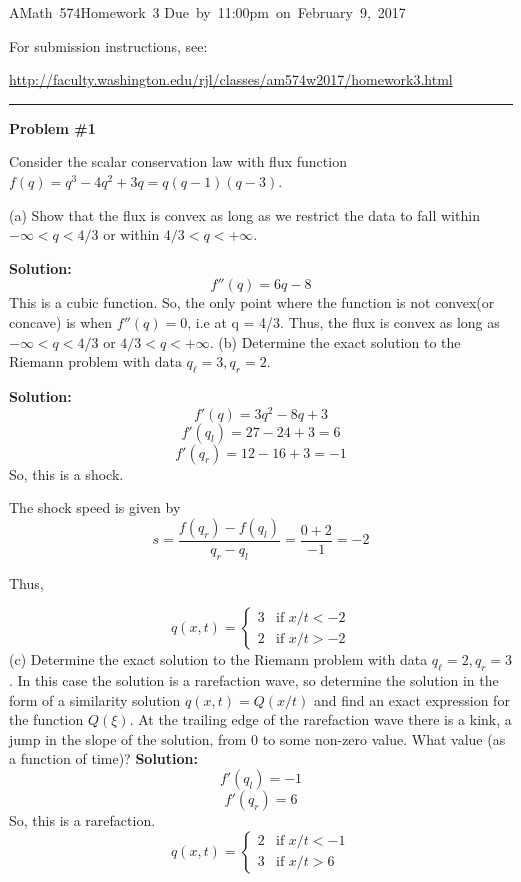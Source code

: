 \documentclass[11pt]{article}
\begin{document}
\hfill\vbox{\hbox{AMath 574}\hbox{Homework 3}
\hbox{Due by 11:00pm on February 9, 2017}}

For submission instructions, see:

\url{http://faculty.washington.edu/rjl/classes/am574w2017/homework3.html}




\vskip 1cm
\hrule
{\bf Problem \#1}

Consider the scalar conservation law with flux function $f(q) = q^3 - 4q^2 +
3q = q(q-1)(q-3)$.

(a) Show that the flux is convex as long as we restrict the data to fall
within $-\infty < q < 4/3$ or within $4/3 < q < +\infty$.

\vskip 1cm
{\bf Solution:}
\[f''(q)=6q - 8 \]
This is a cubic function. So, the only point where the function is not convex(or concave) is when $f''(q)=0$, i.e at q = 4/3.
Thus, the flux is convex as long as $-\infty < q < 4/3$ or $4/3 < q < +\infty$.
\vskip 1cm
(b) Determine the exact solution to the Riemann problem with data $q_\ell =
3, q_r = 2$.  

\vskip 1cm
{\bf Solution:}
\[f'(q)=3q^2 - 8q+3 \]
\[f'(q_l)=27 - 24+3 =6\]
\[f'(q_r)=12 - 16+3 =-1\]
So, this is a shock.

The shock speed is given by 
\[s= \frac{f(q_r)-f(q_l)}{q_r -q_l}= \frac{0+2}{-1}=-2\]

Thus,

\[q(x,t)= \begin{cases}
3 & \text{if~}x/t <-2\\          2 & \text{if~} x/t >-2
\end{cases}\]
\vskip 1cm
(c) Determine the exact solution to the Riemann problem with data $q_\ell =
2, q_r = 3$.  In this case the solution is a rarefaction wave, so determine
the solution in the form of a similarity solution $q(x,t) = Q(x/t)$ and find
an exact expression for the function $Q(\xi)$. At the trailing edge of the
rarefaction wave there is a kink, a jump in the slope of the solution, from
0 to some non-zero value.  What value (as a function of time)?
\vskip 1cm
{\bf Solution:}
\[f'(q_l)=-1\]
\[f'(q_r)=6\]
So, this is a rarefaction.
\[q(x,t)= \begin{cases}
2 & \text{if~}x/t <-1\\          3 & \text{if~} x/t >6
\end{cases}\]
\end{document}
